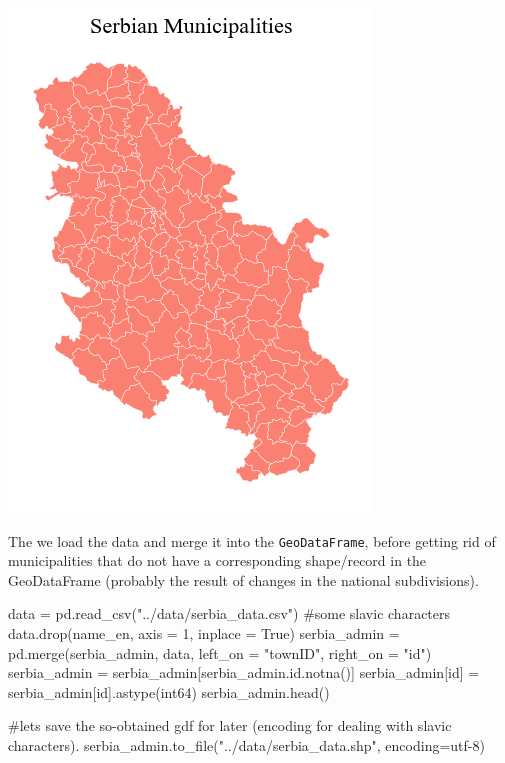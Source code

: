 \documentclass[
  letterpaper,
  DIV=11,
  numbers=noendperiod]{scrreprt}
\newenvironment{Shaded}{\begin{snugshade}}{\end{snugshade}}
\newcommand{\BuiltInTok}[1]{\textcolor[rgb]{0.00,0.23,0.31}{#1}}
\newcommand{\CommentTok}[1]{\textcolor[rgb]{0.37,0.37,0.37}{#1}}
\newcommand{\DecValTok}[1]{\textcolor[rgb]{0.68,0.00,0.00}{#1}}
\newcommand{\NormalTok}[1]{\textcolor[rgb]{0.00,0.23,0.31}{#1}}
\newcommand{\OperatorTok}[1]{\textcolor[rgb]{0.37,0.37,0.37}{#1}}
\newcommand{\StringTok}[1]{\textcolor[rgb]{0.13,0.47,0.30}{#1}}
\newcommand{\VariableTok}[1]{\textcolor[rgb]{0.07,0.07,0.07}{#1}}
\begin{document}
\includegraphics{labs/w02_maps_files/figure-pdf/cell-26-output-2.png}

The we load the data and merge it into the \texttt{GeoDataFrame}, before
getting rid of municipalities that do not have a corresponding
shape/record in the GeoDataFrame (probably the result of changes in the
national subdivisions).

\begin{Shaded}
\begin{Highlighting}[]
\NormalTok{data }\OperatorTok{=}\NormalTok{ pd.read\_csv(}\StringTok{"../data/serbia\_data.csv"}\NormalTok{) }\CommentTok{\#some slavic characters }
\NormalTok{data.drop(}\StringTok{\textquotesingle{}name\_en\textquotesingle{}}\NormalTok{, axis }\OperatorTok{=} \DecValTok{1}\NormalTok{, inplace }\OperatorTok{=} \VariableTok{True}\NormalTok{)}
\NormalTok{serbia\_admin }\OperatorTok{=}\NormalTok{ pd.merge(serbia\_admin, data, left\_on }\OperatorTok{=} \StringTok{"townID"}\NormalTok{, right\_on }\OperatorTok{=} \StringTok{"id"}\NormalTok{)}
\NormalTok{serbia\_admin }\OperatorTok{=}\NormalTok{ serbia\_admin[serbia\_admin.}\BuiltInTok{id}\NormalTok{.notna()]}
\NormalTok{serbia\_admin[}\StringTok{\textquotesingle{}id\textquotesingle{}}\NormalTok{] }\OperatorTok{=}\NormalTok{ serbia\_admin[}\StringTok{\textquotesingle{}id\textquotesingle{}}\NormalTok{].astype(}\StringTok{\textquotesingle{}int64\textquotesingle{}}\NormalTok{)}
\NormalTok{serbia\_admin.head()}

\CommentTok{\#let\textquotesingle{}s save the so{-}obtained gdf for later (encoding for dealing with slavic characters).}
\NormalTok{serbia\_admin.to\_file(}\StringTok{"../data/serbia\_data.shp"}\NormalTok{, encoding}\OperatorTok{=}\StringTok{\textquotesingle{}utf{-}8\textquotesingle{}}\NormalTok{)}
\end{Highlighting}
\end{Shaded}
\end{document}
